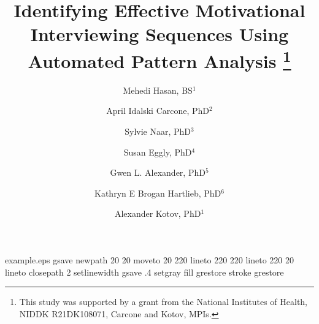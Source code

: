 %
%
%
%
%
\begin{filecontents*}{example.eps}
gsave
newpath
  20 20 moveto
  20 220 lineto
  220 220 lineto
  220 20 lineto
closepath
2 setlinewidth
gsave
  .4 setgray fill
grestore
stroke
grestore
\end{filecontents*}
%
\RequirePackage{fix-cm}
%
\documentclass[smallextended]{svjour3}       %
%
\smartqed  %
%
\usepackage{graphicx}
\usepackage[numbers]{natbib}
\usepackage{geometry}
\usepackage{pdflscape}
%
\usepackage{mathptmx}      %
%
%
%
%


\title{Identifying Effective Motivational Interviewing Sequences Using Automated Pattern Analysis
\thanks{This study was supported by a grant from the National Institutes of Health, NIDDK R21DK108071, Carcone and Kotov, MPIs.}
}


\author{Mehedi Hasan, BS$^1$\and 
April Idalski Carcone, PhD$^2$\and 
Sylvie Naar, PhD$^3$\and 
Susan Eggly, PhD$^4$\and  
Gwen L. Alexander, PhD$^5$\and 
Kathryn E Brogan Hartlieb, PhD$^6$\and 
Alexander Kotov, PhD$^1$
}

